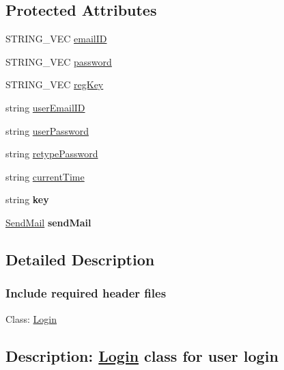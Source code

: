 \subsection*{Protected Attributes}
\begin{DoxyCompactItemize}
\item 
S\-T\-R\-I\-N\-G\-\_\-\-V\-E\-C \hyperlink{classLogin_abea56d6d6403f1e627294f222dd77310}{email\-I\-D}
\item 
S\-T\-R\-I\-N\-G\-\_\-\-V\-E\-C \hyperlink{classLogin_a39f7fd03b2b27c927c657ee73e7fcbbc}{password}
\item 
S\-T\-R\-I\-N\-G\-\_\-\-V\-E\-C \hyperlink{classLogin_ae22f0ed73e5248cd71a7b2167676376a}{reg\-Key}
\item 
string \hyperlink{classLogin_aa83b4706e0f0f0afc65f210ee8e4839a}{user\-Email\-I\-D}
\item 
string \hyperlink{classLogin_a9731be126468f535f161f045c95687c6}{user\-Password}
\item 
string \hyperlink{classLogin_ade36f8943aafce470ef4b8353c79b2c6}{retype\-Password}
\item 
string \hyperlink{classLogin_a624f15ecf989648b73a91743f67a6880}{current\-Time}
\item 
\hypertarget{classLogin_ab7769b44690490b43fc9046ad5958baf}{string {\bfseries key}}\label{classLogin_ab7769b44690490b43fc9046ad5958baf}

\item 
\hypertarget{classLogin_a36ff1dd294aaaf884805325cee3b83d3}{\hyperlink{classSendMail}{Send\-Mail} {\bfseries send\-Mail}}\label{classLogin_a36ff1dd294aaaf884805325cee3b83d3}

\end{DoxyCompactItemize}


\subsection{Detailed Description}


 \subsubsection*{Include required header files}



 Class\-: \hyperlink{classLogin}{Login} \subsection*{Description\-: \hyperlink{classLogin}{Login} class for user login}

